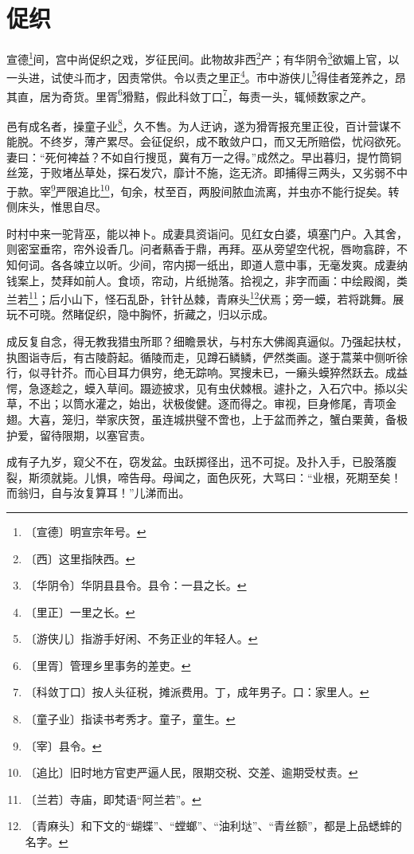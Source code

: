 \documentclass[12pt,UTF-8,openany]{ctexbook}
\begin{document}
\chapter{促织}

\begin{normalsize}
    
    宣德\footnote{〔宣德〕明宣宗年号。}间，宫中尚促织之戏，岁征民间。此物故非西\footnote{〔西〕这里指陕西。}产；有华阴令\footnote{〔华阴令〕华阴县县令。县令：一县之长。}欲媚上官，以一头进，试使斗而才，因责常供。令以责之里正\footnote{〔里正〕一里之长。}。市中游侠儿\footnote{〔游侠儿〕指游手好闲、不务正业的年轻人。}得佳者笼养之，昂其直，居为奇货。里胥\footnote{〔里胥〕管理乡里事务的差吏。}猾黠，假此科敛丁口\footnote{〔科敛丁口〕按人头征税，摊派费用。丁，成年男子。口：家里人。}，每责一头，辄倾数家之产。
    
    邑有成名者，操童子业\footnote{〔童子业〕指读书考秀才。童子，童生。}，久不售。为人迂讷，遂为猾胥报充里正役，百计营谋不能脱。不终岁，薄产累尽。会征促织，成不敢敛户口，而又无所赔偿，忧闷欲死。妻曰：“死何裨益？不如自行搜觅，冀有万一之得。”成然之。早出暮归，提竹筒铜丝笼，于败堵丛草处，探石发穴，靡计不施，迄无济。即捕得三两头，又劣弱不中于款。宰\footnote{〔宰〕县令。}严限追比\footnote{〔追比〕旧时地方官吏严逼人民，限期交税、交差、逾期受杖责。}，旬余，杖至百，两股间脓血流离，并虫亦不能行捉矣。转侧床头，惟思自尽。
    
    时村中来一驼背巫，能以神卜。成妻具资诣问。见红女白婆，填塞门户。入其舍，则密室垂帘，帘外设香几。问者爇香于鼎，再拜。巫从旁望空代祝，唇吻翕辟，不知何词。各各竦立以听。少间，帘内掷一纸出，即道人意中事，无毫发爽。成妻纳钱案上，焚拜如前人。食顷，帘动，片纸抛落。拾视之，非字而画：中绘殿阁，类兰若\footnote{〔兰若〕寺庙，即梵语“阿兰若”。}；后小山下，怪石乱卧，针针丛棘，青麻头\footnote{〔青麻头〕和下文的“蝴蝶”、“螳螂”、“油利垯”、“青丝额”，都是上品蟋蟀的名字。}伏焉；旁一蟆，若将跳舞。展玩不可晓。然睹促织，隐中胸怀，折藏之，归以示成。
    
    成反复自念，得无教我猎虫所耶？细瞻景状，与村东大佛阁真逼似。乃强起扶杖，执图诣寺后，有古陵蔚起。循陵而走，见蹲石鳞鳞，俨然类画。遂于蒿莱中侧听徐行，似寻针芥。而心目耳力俱穷，绝无踪响。冥搜未已，一癞头蟆猝然跃去。成益愕，急逐趁之，蟆入草间。蹑迹披求，见有虫伏棘根。遽扑之，入石穴中。掭以尖草，不出；以筒水灌之，始出，状极俊健。逐而得之。审视，巨身修尾，青项金翅。大喜，笼归，举家庆贺，虽连城拱璧不啻也，上于盆而养之，蟹白栗黄，备极护爱，留待限期，以塞官责。
    
    成有子九岁，窥父不在，窃发盆。虫跃掷径出，迅不可捉。及扑入手，已股落腹裂，斯须就毙。儿惧，啼告母。母闻之，面色灰死，大骂曰：“业根，死期至矣！而翁归，自与汝复算耳！”儿涕而出。
    

\end{normalsize}
\end{document}
